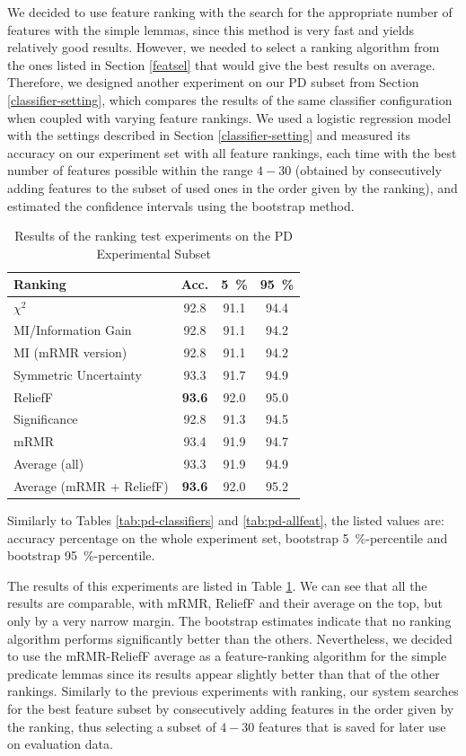 \documentclass[12pt,notitlepage,a4paper]{report}
\begin{document}
We decided to use feature ranking with the search for the appropriate number of features with the simple lemmas, since this method is very fast and yields relatively good results. However, we needed to select a ranking algorithm from the ones listed in Section \ref{featsel} that would give the best results on average. Therefore, we designed another experiment on our PD subset from Section \ref{classifier-setting}, which compares the results of the same classifier configuration when coupled with varying feature rankings. We used a logistic regression model with the settings described in Section \ref{classifier-setting} and measured its accuracy on our experiment set with all feature rankings, each time with the best number of features possible within the range $4-30$ (obtained by consecutively adding features to the subset of used ones in the order given by the ranking), and estimated the confidence intervals using the bootstrap method.

\begin{table}[htpb]
\caption{Results of the ranking test experiments on the PD Experimental Subset}\label{tab:ranker-test}\footnotesize
\begin{center}
\begin{tabular}{|l|c|c|c|}\hline
\bf Ranking & \bf Acc. & \bf 5~\% & \bf 95~\% \\\hline
$\chi^2$ & 92.8 & 91.1 & 94.4 \\
MI/Information Gain & 92.8 & 91.1 & 94.2 \\
MI (mRMR version) & 92.8 & 91.1 & 94.2 \\
Symmetric Uncertainty & 93.3 & 91.7 & 94.9 \\
ReliefF & \bf 93.6 & 92.0 & 95.0 \\
Significance & 92.8 & 91.3 & 94.5 \\
mRMR & 93.4 & 91.9 & 94.7 \\
Average (all) & 93.3 & 91.9 & 94.9 \\
Average (mRMR + ReliefF) & \bf 93.6 & 92.0 & 95.2 \\\hline
\end{tabular}
\end{center}
Similarly to Tables \ref{tab:pd-classifiers} and \ref{tab:pd-allfeat}, the listed values are: accuracy percentage on the whole experiment set, bootstrap 5~\%-percentile and bootstrap 95~\%-percentile. 
\end{table}

The results of this experiments are listed in Table \ref{tab:ranker-test}. We can see that all the results are comparable, with mRMR, ReliefF and their average on the top, but only by a very narrow margin. The bootstrap estimates indicate that no ranking algorithm performs significantly better than the others. Nevertheless, we decided to use the mRMR-ReliefF average as a feature-ranking algorithm for the simple predicate lemmas since its results appear slightly better than that of the other rankings. Similarly to the previous experiments with ranking, our system searches for the best feature subset by consecutively adding features in the order given by the ranking, thus selecting a subset of $4-30$ features that is saved for later use on evaluation data.
\end{document}
